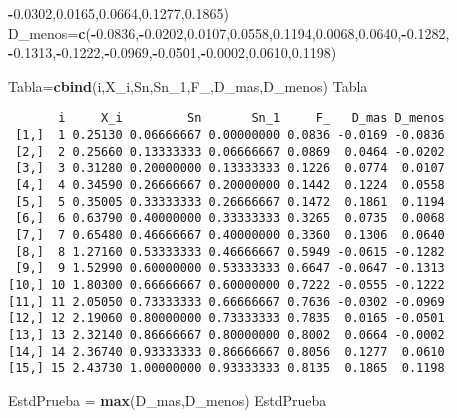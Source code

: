 \documentclass[
  a4paper,
  oneside,
  openany]{book}
\newenvironment{Shaded}{\begin{snugshade}}{\end{snugshade}}
\newcommand{\FloatTok}[1]{\textcolor[rgb]{0.00,0.00,0.81}{#1}}
\newcommand{\FunctionTok}[1]{\textcolor[rgb]{0.13,0.29,0.53}{\textbf{#1}}}
\newcommand{\NormalTok}[1]{#1}
\newcommand{\OtherTok}[1]{\textcolor[rgb]{0.56,0.35,0.01}{#1}}
\newcommand{\SpecialCharTok}[1]{\textcolor[rgb]{0.81,0.36,0.00}{\textbf{#1}}}
\begin{document}
\begin{Shaded}
\begin{Highlighting}[]
                \SpecialCharTok{{-}}\FloatTok{0.0302}\NormalTok{,}\FloatTok{0.0165}\NormalTok{,}\FloatTok{0.0664}\NormalTok{,}\FloatTok{0.1277}\NormalTok{,}\FloatTok{0.1865}\NormalTok{)}
\NormalTok{D\_menos}\OtherTok{=}\FunctionTok{c}\NormalTok{(}\SpecialCharTok{{-}}\FloatTok{0.0836}\NormalTok{,}\SpecialCharTok{{-}}\FloatTok{0.0202}\NormalTok{,}\FloatTok{0.0107}\NormalTok{,}\FloatTok{0.0558}\NormalTok{,}\FloatTok{0.1194}\NormalTok{,}\FloatTok{0.0068}\NormalTok{,}\FloatTok{0.0640}\NormalTok{,}\SpecialCharTok{{-}}\FloatTok{0.1282}\NormalTok{,}
          \SpecialCharTok{{-}}\FloatTok{0.1313}\NormalTok{,}\SpecialCharTok{{-}}\FloatTok{0.1222}\NormalTok{,}\SpecialCharTok{{-}}\FloatTok{0.0969}\NormalTok{,}\SpecialCharTok{{-}}\FloatTok{0.0501}\NormalTok{,}\SpecialCharTok{{-}}\FloatTok{0.0002}\NormalTok{,}\FloatTok{0.0610}\NormalTok{,}\FloatTok{0.1198}\NormalTok{)}

\NormalTok{Tabla}\OtherTok{=}\FunctionTok{cbind}\NormalTok{(i,X\_i,Sn,Sn\_1,F\_,D\_mas,D\_menos)                                                                                                                                                      }
\NormalTok{Tabla}
\end{Highlighting}
\end{Shaded}

\begin{verbatim}
       i     X_i         Sn       Sn_1     F_   D_mas D_menos
 [1,]  1 0.25130 0.06666667 0.00000000 0.0836 -0.0169 -0.0836
 [2,]  2 0.25660 0.13333333 0.06666667 0.0869  0.0464 -0.0202
 [3,]  3 0.31280 0.20000000 0.13333333 0.1226  0.0774  0.0107
 [4,]  4 0.34590 0.26666667 0.20000000 0.1442  0.1224  0.0558
 [5,]  5 0.35005 0.33333333 0.26666667 0.1472  0.1861  0.1194
 [6,]  6 0.63790 0.40000000 0.33333333 0.3265  0.0735  0.0068
 [7,]  7 0.65480 0.46666667 0.40000000 0.3360  0.1306  0.0640
 [8,]  8 1.27160 0.53333333 0.46666667 0.5949 -0.0615 -0.1282
 [9,]  9 1.52990 0.60000000 0.53333333 0.6647 -0.0647 -0.1313
[10,] 10 1.80300 0.66666667 0.60000000 0.7222 -0.0555 -0.1222
[11,] 11 2.05050 0.73333333 0.66666667 0.7636 -0.0302 -0.0969
[12,] 12 2.19060 0.80000000 0.73333333 0.7835  0.0165 -0.0501
[13,] 13 2.32140 0.86666667 0.80000000 0.8002  0.0664 -0.0002
[14,] 14 2.36740 0.93333333 0.86666667 0.8056  0.1277  0.0610
[15,] 15 2.43730 1.00000000 0.93333333 0.8135  0.1865  0.1198
\end{verbatim}

\begin{Shaded}
\begin{Highlighting}[]
\NormalTok{EstdPrueba }\OtherTok{=} \FunctionTok{max}\NormalTok{(D\_mas,D\_menos)}
\NormalTok{EstdPrueba}
\end{Highlighting}
\end{Shaded}
\end{document}
